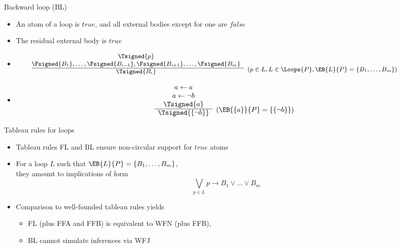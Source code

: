 \begin{frame}{Backward loop (BL)}
\begin{itemize}
\item {} An atom of a loop is $\mathit{true}$,
  and all external bodies except for one are $\mathit{false}$
\item {} The residual external body is $\mathit{true}$
\item {}
\[
\hspace{-10mm}
{\small
\begin{array}{@{}cl}
\Tsigned{p} \\
\Fsigned{B_1},\dots,\Fsigned{B_{i-1}},\Fsigned{B_{i+1}},\dots,\Fsigned{B_m} &
\raisebox{-8pt}[0pt][0pt]{($p \in L, L \in \Loops{P}, \EB{L}{P}=\{B_1,\dots,B_m\}$)}
\\\cline{1-1}
\Tsigned{B_i}
\end{array}
}
\]
\item<2-> 
\[
\begin{array}{cl}
a \leftarrow a \\
a \leftarrow \neg b \\
\Tsigned{a}&
\raisebox{-8pt}[0pt][0pt]{($\EB{\{a\}}{P}=\{\{\neg b\}\}$)}
\\\cline{1-1}
\Tsigned{\{\neg b\}}
\end{array}
\]
\end{itemize}
\end{frame}
\begin{frame}{Tableau rules for loops}
  \bigskip
  \begin{itemize}
  \item<1-> Tableau rules FL and BL ensure non-circular support for $\mathit{true}$ atoms
  \item<2-> For a loop $L$ such that $\EB{L}{P}=\{B_1,\dots,B_m\}$,\\
    they amount to implications of form
    \[
    \textstyle\bigvee_{p\in L} p \rightarrow B_1 \vee\dots\vee B_m
    \]
  \item<3-> Comparison to well-founded tableau rules yields
    \begin{itemize}\normalsize
    \item FL (plus FFA and FFB) is equivalent to WFN (plus FFB),
    \item BL cannot simulate inferences via WFJ
    \end{itemize}
  \end{itemize}
\end{frame}
